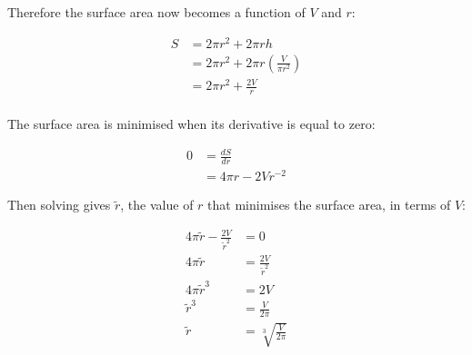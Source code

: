 \documentclass[12pt]{article}
\begin{document}
\vspace{5mm}

\begin{mdframed}[linewidth=0.5mm, backgroundcolor=orange!10]
Therefore the surface area now becomes a function of $V$ and $r$:
\end{mdframed}


\begin{minipage}[t]{\textwidth}
\begin{mdframed}[linewidth=0.5mm, backgroundcolor=cyan!10]
\begin{align*}
S &= 2\pi r^2 + 2 \pi rh \\
&= 2\pi r^2 + 2 \pi r\left(\frac{V}{\pi r^2}\right) \\
&= 2\pi r^2 + \frac{2 V}{r} \\
\end{align*}
\end{mdframed}
\end{minipage}

\vspace{5mm}

\begin{mdframed}[linewidth=0.5mm, backgroundcolor=orange!10]
The surface area is minimised when its derivative is equal to zero:
\end{mdframed}


\begin{minipage}[t]{\textwidth}
\begin{mdframed}[linewidth=0.5mm, backgroundcolor=cyan!10]
\begin{align*}
0 &= \frac{dS}{dr} \\
&= 4\pi r - 2Vr^{-2}
\end{align*}
\end{mdframed}
\end{minipage}

\vspace{5mm}

\begin{mdframed}[linewidth=0.5mm, backgroundcolor=orange!10]
Then solving gives $\tilde{r}$, the value of $r$ that minimises the surface area, in terms of $V$:
\end{mdframed}


\begin{minipage}[t]{\textwidth}
\begin{mdframed}[linewidth=0.5mm, backgroundcolor=cyan!10]
\begin{align*}
4\pi \tilde{r} - \frac{2V}{\tilde{r}^{2}} &= 0 \\
4\pi \tilde{r} &= \frac{2V}{\tilde{r}^{2}} \\
4\pi \tilde{r}^3 &= 2V \\
\tilde{r}^3 &= \frac{V}{2\pi} \\
\tilde{r} &= \sqrt[3]{\frac{V}{2\pi}} \\
\end{align*}
\end{mdframed}
\end{minipage}
\end{document}
